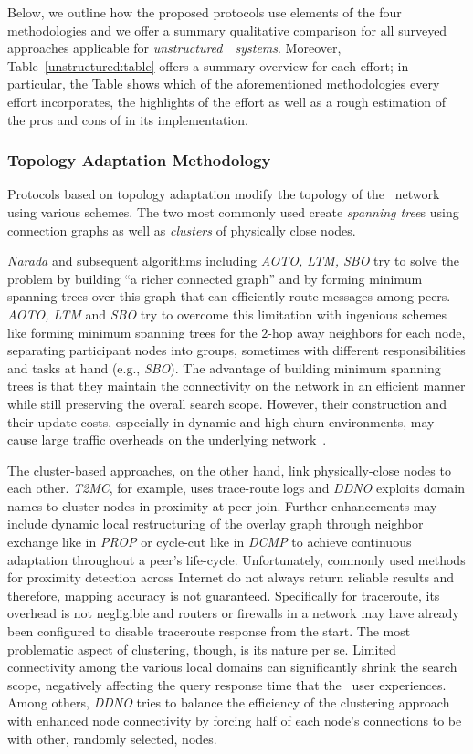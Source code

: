 Below, we outline how the proposed protocols use elements of the four
methodologies and we offer a summary qualitative comparison for all surveyed
approaches applicable for \emph{unstructured}~\p~\emph{systems}.
Moreover, Table~\ref{unstructured:table} offers a summary overview for each effort;
in particular, the Table shows which of the aforementioned methodologies 
every effort incorporates, the highlights of the effort as well as 
a rough estimation of the pros and cons of in its implementation.

\subsubsection{Topology Adaptation Methodology}

Protocols based on topology adaptation 
modify the topology of the \p\ network
using various schemes. The two most commonly used
create \emph{spanning tree}s using connection graphs
as well as  \emph{clusters} of physically close nodes.

\emph{Narada} and subsequent algorithms including 
\emph{AOTO, LTM, SBO} try to solve the problem
by building ``a richer connected graph'' and by forming 
minimum spanning trees over
this graph that can efficiently route messages among peers. 
\emph{AOTO, LTM} and \emph{SBO} try to
overcome this limitation with ingenious schemes
like forming minimum spanning trees
for the $2$-hop away neighbors for each node, separating participant nodes into
groups, sometimes with different responsibilities and tasks at hand (e.g.,
\emph{SBO}). 
The advantage of building minimum spanning trees is that
they maintain the connectivity on the network in
an efficient manner while still preserving the overall search scope.
However, their construction and their update costs,
especially in dynamic and high-churn environments,
may cause large traffic overheads on the underlying
network~\cite{CRZ2000,CRSZ2001,CRSZ2002}.

The cluster-based approaches, on the other hand, 
link physically-close nodes to each other. 
\emph{T2MC}, for example, uses trace-route logs and 
\emph{DDNO} exploits domain names to cluster nodes in proximity at peer join.
Further enhancements may include dynamic local restructuring of the overlay
graph through neighbor exchange like in \emph{PROP} or cycle-cut like in
\emph{DCMP} to achieve continuous adaptation throughout a peer's life-cycle.
Unfortunately, commonly used methods for proximity detection across Internet do
not always return
reliable results and therefore, mapping accuracy is not guaranteed. Specifically
for traceroute, its overhead is not negligible and routers or firewalls in a
network may have already been configured to disable traceroute response from
the start. 
The most problematic aspect of clustering, though, is
its nature per se. 
Limited connectivity among the various local domains can
significantly shrink the search scope, negatively affecting the query response
time that the \p\ user experiences. 
Among others, \emph{DDNO} tries to 
balance the efficiency of the clustering approach 
with enhanced node connectivity by forcing half of each node's connections to be
with other, randomly selected, nodes.

